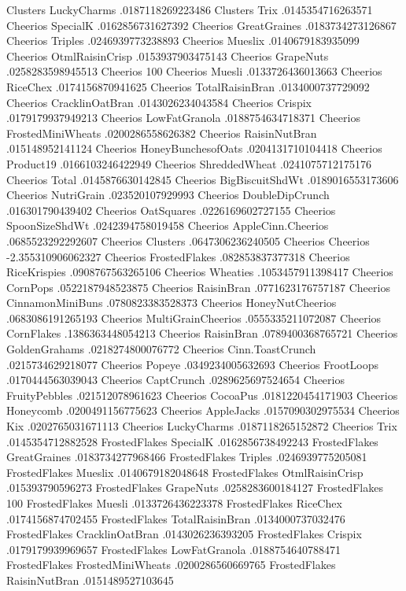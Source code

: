 Clusters	LuckyCharms	.0187118269223486
Clusters	Trix	.0145354716263571
Cheerios	SpecialK	.0162856731627392
Cheerios	GreatGraines	.0183734273126867
Cheerios	Triples	.0246939773238893
Cheerios	Mueslix	.0140679183935099
Cheerios	OtmlRaisinCrisp	.0153937903475143
Cheerios	GrapeNuts	.0258283598945513
Cheerios	100%
Cheerios	Muesli	.0133726436013663
Cheerios	RiceChex	.0174156870941625
Cheerios	TotalRaisinBran	.0134000737729092
Cheerios	CracklinOatBran	.0143026234043584
Cheerios	Crispix	.0179179937949213
Cheerios	LowFatGranola	.0188754634718371
Cheerios	FrostedMiniWheats	.0200286558626382
Cheerios	RaisinNutBran	.015148952141124
Cheerios	HoneyBunchesofOats	.0204131710104418
Cheerios	Product19	.0166103246422949
Cheerios	ShreddedWheat	.0241075712175176
Cheerios	Total	.0145876630142845
Cheerios	BigBiscuitShdWt	.0189016553173606
Cheerios	NutriGrain	.023520107929993
Cheerios	DoubleDipCrunch	.016301790439402
Cheerios	OatSquares	.0226169602727155
Cheerios	SpoonSizeShdWt	.0242394758019458
Cheerios	AppleCinn.Cheerios	.0685523292292607
Cheerios	Clusters	.0647306236240505
Cheerios	Cheerios	-2.355310906062327
Cheerios	FrostedFlakes	.082853837377318
Cheerios	RiceKrispies	.0908767563265106
Cheerios	Wheaties	.1053457911398417
Cheerios	CornPops	.0522187948523875
Cheerios	RaisinBran	.0771623176757187
Cheerios	CinnamonMiniBuns	.0780823383528373
Cheerios	HoneyNutCheerios	.0683086191265193
Cheerios	MultiGrainCheerios	.0555335211072087
Cheerios	CornFlakes	.1386363448054213
Cheerios	RaisinBran	.0789400368765721
Cheerios	GoldenGrahams	.0218274800076772
Cheerios	Cinn.ToastCrunch	.0215734629218077
Cheerios	Popeye	.0349234005632693
Cheerios	FrootLoops	.0170444563039043
Cheerios	CaptCrunch	.0289625697524654
Cheerios	FruityPebbles	.021512078961623
Cheerios	CocoaPus	.0181220454171903
Cheerios	Honeycomb	.0200491156775623
Cheerios	AppleJacks	.0157090302975534
Cheerios	Kix	.0202765031671113
Cheerios	LuckyCharms	.0187118265152872
Cheerios	Trix	.0145354712882528
FrostedFlakes	SpecialK	.0162856738492243
FrostedFlakes	GreatGraines	.0183734277968466
FrostedFlakes	Triples	.0246939775205081
FrostedFlakes	Mueslix	.0140679182048648
FrostedFlakes	OtmlRaisinCrisp	.015393790596273
FrostedFlakes	GrapeNuts	.0258283600184127
FrostedFlakes	100%
FrostedFlakes	Muesli	.0133726436223378
FrostedFlakes	RiceChex	.0174156874702455
FrostedFlakes	TotalRaisinBran	.0134000737032476
FrostedFlakes	CracklinOatBran	.0143026236393205
FrostedFlakes	Crispix	.0179179939969657
FrostedFlakes	LowFatGranola	.0188754640788471
FrostedFlakes	FrostedMiniWheats	.0200286560669765
FrostedFlakes	RaisinNutBran	.0151489527103645
